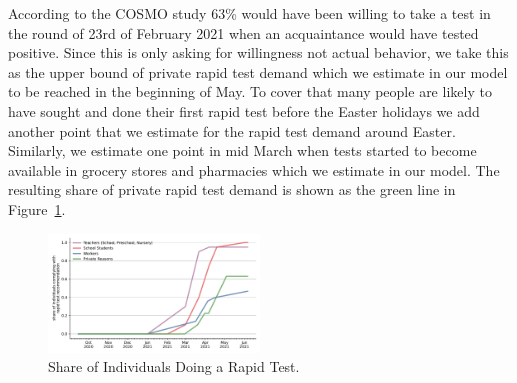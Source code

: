 According to the COSMO study \citep{Betsch2021a} 63\% would have been willing to take a
test in the round of 23rd of February 2021 when an acquaintance would have tested
positive. Since this is only asking for willingness not actual behavior, we take this as
the upper bound of private rapid test demand which we estimate in our model to be reached
in the beginning of May. To cover that many people are likely to have sought and done
their first rapid test before the Easter holidays we add another point that we estimate
for the rapid test demand around Easter. Similarly, we estimate one point in mid March
when tests started to become available in grocery stores and pharmacies which we estimate
in our model. The resulting share of private rapid test demand is shown as the green line
in Figure~\ref{fig:rapid_test_demand}.


\begin{figure}
    \centering
    \includegraphics[width=0.5\textwidth]{figures/results/figures/data/testing/rapid_test_demand_shares}
    \caption{Share of Individuals Doing a Rapid Test.}
    \label{fig:rapid_test_demand}
    \label{fig:rapid_test_demand}
\end{figure}

\FloatBarrier